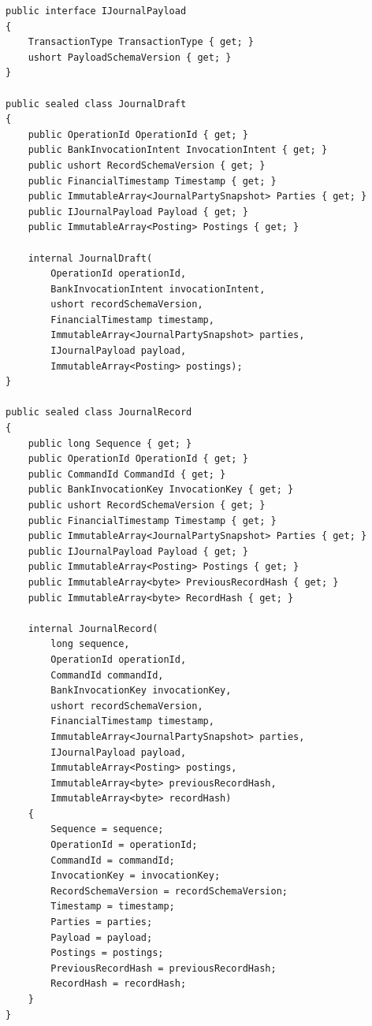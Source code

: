 \documentclass[
  10pt,
  letterpaper,
]{article}
\begin{document}
\begin{lstlisting}
public interface IJournalPayload
{
    TransactionType TransactionType { get; }
    ushort PayloadSchemaVersion { get; }
}

public sealed class JournalDraft
{
    public OperationId OperationId { get; }
    public BankInvocationIntent InvocationIntent { get; }
    public ushort RecordSchemaVersion { get; }
    public FinancialTimestamp Timestamp { get; }
    public ImmutableArray<JournalPartySnapshot> Parties { get; }
    public IJournalPayload Payload { get; }
    public ImmutableArray<Posting> Postings { get; }

    internal JournalDraft(
        OperationId operationId,
        BankInvocationIntent invocationIntent,
        ushort recordSchemaVersion,
        FinancialTimestamp timestamp,
        ImmutableArray<JournalPartySnapshot> parties,
        IJournalPayload payload,
        ImmutableArray<Posting> postings);
}

public sealed class JournalRecord
{
    public long Sequence { get; }
    public OperationId OperationId { get; }
    public CommandId CommandId { get; }
    public BankInvocationKey InvocationKey { get; }
    public ushort RecordSchemaVersion { get; }
    public FinancialTimestamp Timestamp { get; }
    public ImmutableArray<JournalPartySnapshot> Parties { get; }
    public IJournalPayload Payload { get; }
    public ImmutableArray<Posting> Postings { get; }
    public ImmutableArray<byte> PreviousRecordHash { get; }
    public ImmutableArray<byte> RecordHash { get; }

    internal JournalRecord(
        long sequence,
        OperationId operationId,
        CommandId commandId,
        BankInvocationKey invocationKey,
        ushort recordSchemaVersion,
        FinancialTimestamp timestamp,
        ImmutableArray<JournalPartySnapshot> parties,
        IJournalPayload payload,
        ImmutableArray<Posting> postings,
        ImmutableArray<byte> previousRecordHash,
        ImmutableArray<byte> recordHash)
    {
        Sequence = sequence;
        OperationId = operationId;
        CommandId = commandId;
        InvocationKey = invocationKey;
        RecordSchemaVersion = recordSchemaVersion;
        Timestamp = timestamp;
        Parties = parties;
        Payload = payload;
        Postings = postings;
        PreviousRecordHash = previousRecordHash;
        RecordHash = recordHash;
    }
}
\end{lstlisting}
\end{document}
